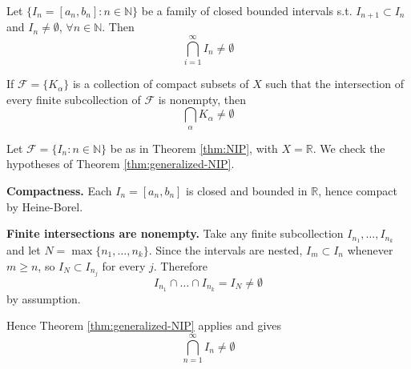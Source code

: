
\begin{theorem}
    \label{thm:NIP}
    Let $\{ I_n = [a_n, b_n]: n \in \mathbb{N} \} $ be a family of closed 
    bounded intervals s.t. $I_{n + 1} \subset I_n$ and $I_n \neq \emptyset$,
    $\forall n \in \mathbb{N}$. Then 
    \[
        \bigcap_{i = 1}^{\infty} I_n \neq \emptyset
    \]
\end{theorem}

\begin{theorem}
    \label{thm:generalized-NIP}
    If $\mathcal{F} = \{ K_{\alpha} \} $ is a collection of compact 
    subsets of $X$ such that the intersection of every finite 
    subcollection of $\mathcal{F}$ is nonempty, then 
    \[
        \bigcap_{\alpha} K_{\alpha} \neq \emptyset
    \]
\end{theorem}

\begin{remark}
    \hfill
    Let $\mathcal{F} = \{ I_n : n \in \mathbb{N} \}$ be as in Theorem \ref{thm:NIP},
    with $X = \mathbb{R}$. We check the hypotheses of Theorem \ref{thm:generalized-NIP}.
    \medskip

    \textbf{Compactness.} Each $I_n = [a_n, b_n]$ is closed and bounded in $\mathbb{R}$,
    hence compact by Heine-Borel.
    \medskip

    \textbf{Finite intersections are nonempty.} Take any finite subcollection
    $I_{n_1}, \hdots, I_{n_k}$ and let $N = \max\{ n_1, \hdots, n_k \}$.
    Since the intervals are nested, $I_m \subset I_n$ whenever $m \geq n$, so
    $I_N \subset I_{n_j}$ for every $j$. Therefore
    \[
        I_{n_1} \cap \hdots \cap I_{n_k} = I_N \neq \emptyset
    \]
    by assumption.
    \medskip

    Hence Theorem \ref{thm:generalized-NIP} applies and gives
    \[
        \bigcap_{n = 1}^{\infty} I_n \neq \emptyset
    \]
\end{remark}

